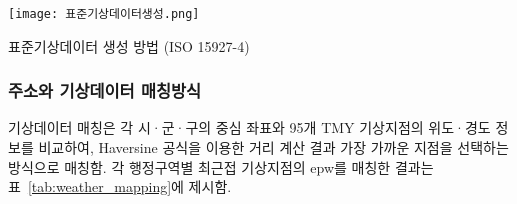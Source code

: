 \begin{defaultfigure}
  \texttt{[image: 표준기상데이터생성.png]}
  \caption{표준기상데이터 생성 방법 (ISO 15927-4)}
  \label{fig:tmyxalgorithm}
\end{defaultfigure}


\subsubsection{주소와 기상데이터 매칭방식}
\label{sec:address_weather_matching}
기상데이터 매칭은 각 시·군·구의 중심 좌표와 95개 TMY 기상지점의 위도·경도 정보를 비교하여, Haversine 공식을 이용한 거리 계산 결과 가장 가까운 지점을 선택하는 방식으로 매칭함. 
각 행정구역별 최근접 기상지점의 epw를 매칭한 결과는 표~\ref{tab:weather_mapping}에 제시함.

\renewcommand{\arraystretch}{0.9}
